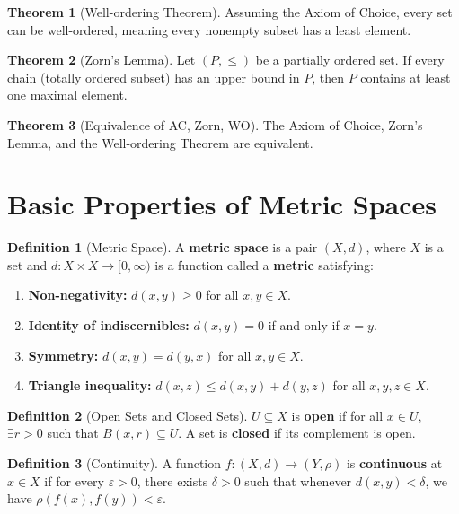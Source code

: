 \documentclass[12pt]{article}
\theoremstyle{definition} %
\newtheorem{theorem}{Theorem}
\newtheorem{definition}{Definition}
\theoremstyle{plain} %
\begin{document}
\begin{theorem}[Well-ordering Theorem]
    Assuming the Axiom of Choice, every set can be well-ordered, meaning every nonempty subset has a least element.
\end{theorem}

\begin{theorem}[Zorn's Lemma]
Let \((P, \leq)\) be a partially ordered set. If every chain (totally ordered subset) has an upper bound in \(P\), then \(P\) contains at least one maximal element.
\end{theorem}

\begin{theorem}[Equivalence of AC, Zorn, WO]
The Axiom of Choice, Zorn's Lemma, and the Well-ordering Theorem are equivalent.
\end{theorem}

\section{Basic Properties of Metric Spaces}

\begin{definition}[Metric Space]
        A \textbf{metric space} is a pair \((X,d)\), where \(X\) is a set and \(d: X \times X \to [0,\infty)\) is a function called a \textbf{metric} satisfying:
        \begin{enumerate}[label=(\roman*)]
            \item \textbf{Non-negativity:} \(d(x,y) \geq 0\) for all \(x,y \in X\).
            \item \textbf{Identity of indiscernibles:} \(d(x,y) = 0\) if and only if \(x = y\).
            \item \textbf{Symmetry:} \(d(x,y) = d(y,x)\) for all \(x,y \in X\).
            \item \textbf{Triangle inequality:} \(d(x,z) \leq d(x,y) + d(y,z)\) for all \(x,y,z \in X\).
        \end{enumerate}
        \end{definition}

\begin{definition}[Open Sets and Closed Sets]
\(U \subseteq X\) is \textbf{open} if for all \(x\in U\), \(\exists r>0\) such that \(B(x,r)\subseteq U\). A set is \textbf{closed} if its complement is open.
\end{definition}

\begin{definition}[Continuity]
A function \(f:(X,d)\to (Y,\rho)\) is \textbf{continuous} at \(x\in X\) if for every \(\varepsilon>0\), there exists \(\delta>0\) such that whenever \(d(x,y)<\delta\), we have \(\rho(f(x),f(y))<\varepsilon\).
\end{definition}
\end{document}
